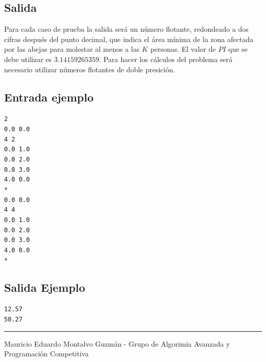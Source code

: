 \documentclass[letter,10pt]{article}
\newcommand{\lyxaddress}[1]{
\par {\raggedright #1
\vspace{1.4em}
\noindent\par}
}
\begin{document}
$$$$
$$$$
$$$$
$$$$
$$$$
$$$$

\subsection*{Salida}

Para cada caso de prueba la salida será un número flotante, redondeado a dos cifras después del punto decimal, que indica el área mínima de la zona afectada por las abejas para molestar al menos a las $K$ personas. El valor de $PI$ que se debe utilizar es $3.14159265359$. Para hacer los cálculos del problema será necesario utilizar números flotantes de doble presición.

\subsection*{Entrada ejemplo}
\noindent \texttt{2}~\\
\texttt{0.0 0.0}~\\
\texttt{4 2}~\\
\texttt{0.0 1.0}~\\
\texttt{0.0 2.0}~\\
\texttt{0.0 3.0}~\\
\texttt{4.0 0.0}~\\
\texttt{*}~\\
\texttt{0.0 0.0}~\\
\texttt{4 4}~\\
\texttt{0.0 1.0}~\\
\texttt{0.0 2.0}~\\
\texttt{0.0 3.0}~\\
\texttt{4.0 0.0}~\\
\texttt{*}~\\
\noindent 

\subsection*{Salida Ejemplo}

\noindent \texttt{12.57}~\\
\texttt{50.27}~\\

\noindent \rule[0.5ex]{1\columnwidth}{1pt}


\lyxaddress{Mauricio Eduardo Montalvo Guzmán - Grupo de Algorimia Avanzada y Programación Competitiva}
\end{document}
